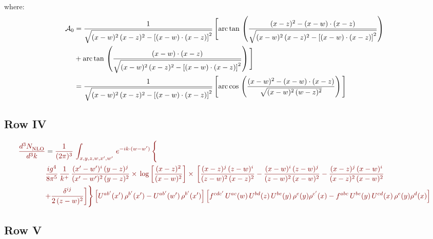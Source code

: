 \documentclass[9pt]{article}
\numberwithin{equation}{section}
\begin{document}
where: \begin{align}
\mathcal{A}_{0} & = \frac{1}{\sqrt{(x-w)^{2}\,(x-z)^{2}-\left[(x-w)\cdot (x-z)\right]^{2}}}\, \Bigg[\mathrm{arc\,tan}\,\left(\frac{(x-z)^{2}-(x-w)\cdot (x-z)}{\sqrt{(x-w)^{2}\,(x-z)^{2}-\left[(x-w)\cdot (x-z)\right]^{2}}}\right)\notag \\ & + \mathrm{arc\,tan}\,\left(\frac{(x-w)\cdot (x-z)}{\sqrt{(x-w)^{2}\,(x-z)^{2}-\left[(x-w)\cdot (x-z)\right]^{2}}}\right) \Bigg]\notag \\ & = \frac{1}{\sqrt{(x-w)^{2}\,(x-z)^{2}-\left[(x-w)\cdot (x-z)\right]^{2}}}\, \Bigg[\mathrm{arc\,cos}\,\left(\frac{(x-w)^{2}-(x-w)\cdot (x-z)}{\sqrt{(x-w)^{2}\,(w-z)^{2}}}\right)\Bigg]
\end{align}
\subsection{Row IV}
\begin{align}
    {\color{red!50!black}\frac{d^{3}N_{\rm NLO}^{\rm}}{d^{3}k}}  & = {\color{red!50!black}\frac{1}{(2\pi)^{3}}\,
    \int_{x,y,z,w,x',w'}\,e^{-ik\cdot (w-w^\prime)}\,\Bigg\{}\notag \\
& {\color{red!50!black}\frac{ig^{4}}{8\pi^{5}}\,\frac{1}{k^{+}}\,\frac{(x'-w')^{i}\,(y-z)^{j}}{(x'-w')^{2}\,(y-z)^{2}}\times\,\log{\left[\frac{(x-z)^{2}}{(x-w)^{2}}\right]}\times\, \bigg[\frac{(x-z)^{j}\,(z-w)^{i}}{(z-w)^{2}\,(x-z)^{2}} -\frac{(x-w)^{i}\,(z-w)^{j}}{(z-w)^{2}\,(x-w)^{2}}-\frac{(x-z)^{j}\,(x-w)^{i}}{(x-z)^{2}\,(x-w)^{2}}}\notag \\ & {\color{red!50!black}+\frac{\delta^{ij}}{2\,(z-w)^{2}}\bigg]\Bigg\} \left[U^{ab'}(x')\,\rho^{b'}(x')-U^{ab'}(w')\,\rho^{b'}(x')\right] \left[f^{cdc'}\,U^{ac}(w)\,U^{bd}(z)\,U^{be}(y)\,\rho^{e}(y)\rho^{c'}(x)-f^{abc}\,U^{be}(y)\,U^{cd}(x)\,\rho^{e}(y)\rho^{d}(x)\right]}
\end{align}
\par\noindent
\subsection{Row V}
\end{document}
